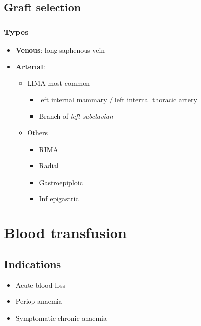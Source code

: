 \documentclass[
  14pt,
]{extarticle}
\providecommand{\tightlist}{%
  \setlength{\itemsep}{0pt}\setlength{\parskip}{0pt}}
\begin{document}
\hypertarget{graft-selection}{%
\subsection{Graft selection}\label{graft-selection}}

\hypertarget{types}{%
\subsubsection{Types}\label{types}}

\begin{itemize}
\tightlist
\item
  \textbf{Venous}: long saphenous vein
\item
  \textbf{Arterial}:

  \begin{itemize}
  \tightlist
  \item
    LIMA most common

    \begin{itemize}
    \tightlist
    \item
      left internal mammary / left internal thoracic artery
    \item
      Branch of \emph{left subclavian}
    \end{itemize}
  \item
    Others

    \begin{itemize}
    \tightlist
    \item
      RIMA
    \item
      Radial
    \item
      Gastroepiploic
    \item
      Inf epigastric
    \end{itemize}
  \end{itemize}
\end{itemize}

\pagebreak

\hypertarget{blood-transfusion}{%
\section{Blood transfusion}\label{blood-transfusion}}

\hypertarget{indications}{%
\subsection{Indications}\label{indications}}

\begin{itemize}
\tightlist
\item
  Acute blood loss
\item
  Periop anaemia
\item
  Symptomatic chronic anaemia
\end{itemize}
\end{document}
